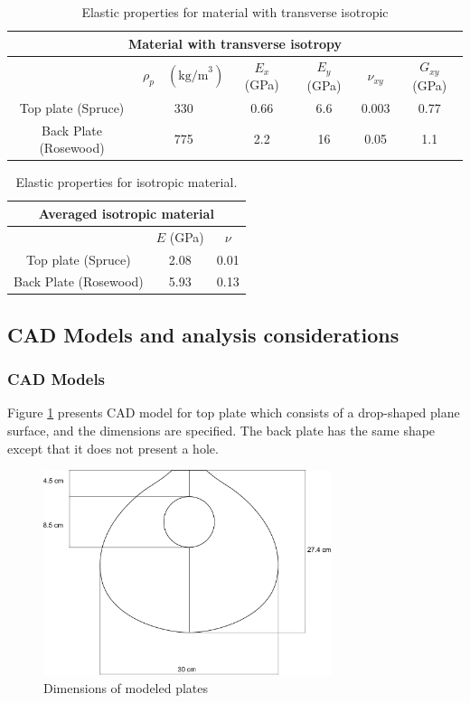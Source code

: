 \begin{table}[htb]
\centering
\begin{tabular}{|c|c|c|c|c|c|}\hline
\multicolumn{6}{|c|}{\vphantom{\LARGE Ap} Material with transverse isotropy}\\ \hline\hline
 & $\rho_p \quad (\text{kg/m}^3)$ & $E_x$ (GPa) & $E_y$ (GPa) & $\nu_{xy}$ & $G_{xy}$ (GPa)\\ \hline
Top plate (Spruce) & 330 & 0.66 & 6.6 & 0.003 & 0.77 \\ \hline
Back Plate (Rosewood) & 775 & 2.2 & 16 & 0.05 & 1.1 \\ \hline
\end{tabular}
\caption{Elastic properties for material with transverse isotropic}
\label{OrthoMat}
\end{table}

\begin{table}[htb]
\centering
\begin{tabular}{|c|c|c|}\hline
\multicolumn{3}{|c|}{\vphantom{\LARGE Ap} Averaged isotropic material}\\ \hline\hline
 & $E$ (GPa) & $\nu$ \\ \hline
Top plate (Spruce) & 2.08 & 0.01 \\ \hline
Back Plate (Rosewood) & 5.93 & 0.13 \\ \hline
\end{tabular}
\caption{Elastic properties for isotropic material.}
\label{IsoMat}
\end{table}

\subsection{CAD Models and analysis considerations}


\subsubsection{CAD Models}

Figure \ref{PlateDimensions} presents CAD model for top plate which consists of a drop-shaped plane surface, and the dimensions are specified. The back plate has the same shape except that it does not present a hole.

\begin{figure}[h]
\centering
\includegraphics[height=6cm]{img/bandolaFrontarea.pdf}
\caption{Dimensions of modeled plates}
\label{PlateDimensions}
\end{figure}


